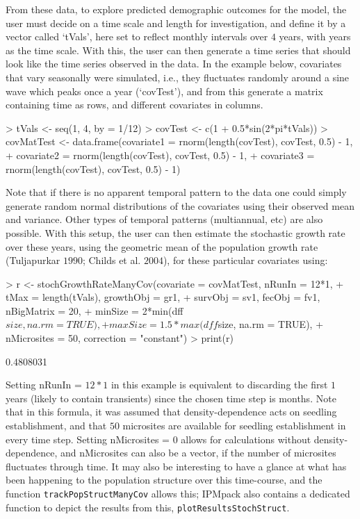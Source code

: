 \documentclass{article}
\begin{document}
From these data, to explore predicted demographic outcomes for the model, the user must decide on a time scale and length for investigation, and define it by a vector called `tVals', here set to reflect monthly intervals over $4$ years, with years as the time scale. With this, the user can then generate a time series that should look like the time series observed in the data. In the example below, covariates that vary seasonally were simulated, i.e., they fluctuates randomly around a sine wave which peaks once a year (`covTest'), and from this generate a matrix containing time as rows, and different covariates in columns.  
\begin{Schunk}
\begin{Sinput}
> tVals <- seq(1, 4, by = 1/12)
> covTest <- c(1 + 0.5*sin(2*pi*tVals))
> covMatTest <- data.frame(covariate1 = rnorm(length(covTest), covTest, 0.5) - 1, 
+                          covariate2 = rnorm(length(covTest), covTest, 0.5) - 1, 
+                          covariate3 = rnorm(length(covTest), covTest, 0.5) - 1)
\end{Sinput}
\end{Schunk}
Note that  if there is no apparent temporal pattern to the data one could simply generate random normal distributions of the covariates using their observed
mean and variance. Other types of temporal patterns (multiannual, etc) are also possible. With this setup, the user can then estimate the stochastic growth rate over these years, using the geometric mean of the population growth rate (Tuljapurkar $1990$; Childs et al. $2004$), for these particular covariates using:
\begin{Schunk}
\begin{Sinput}
> r <- stochGrowthRateManyCov(covariate = covMatTest, nRunIn = 12*1, 
+                             tMax = length(tVals), growthObj = gr1, 
+                             survObj = sv1, fecObj = fv1, nBigMatrix = 20, 
+                             minSize = 2*min(dff$size, na.rm = TRUE), 
+                             maxSize = 1.5*max(dff$size, na.rm = TRUE), 
+                             nMicrosites = 50, correction = "constant")
> print(r)
\end{Sinput}
\begin{Soutput}
[1] 0.4808031
\end{Soutput}
\end{Schunk}
Setting nRunIn = $12*1$ in this example is equivalent to discarding the first $1$ years (likely to contain transients) since the chosen time step is months. Note that in this formula, it was assumed that density-dependence acts on seedling establishment, and that $50$ microsites are available for seedling establishment in every time step. Setting nMicrosites = $0$ allows for calculations without density-dependence, and nMicrosites can also be a vector, if the number of microsites fluctuates through time. It may also be interesting to have a glance at what has been happening to the population structure over this time-course, and the function {\tt trackPopStructManyCov} allows this; IPMpack also contains a dedicated function to depict the results from this, {\tt plotResultsStochStruct}.
\end{document}
